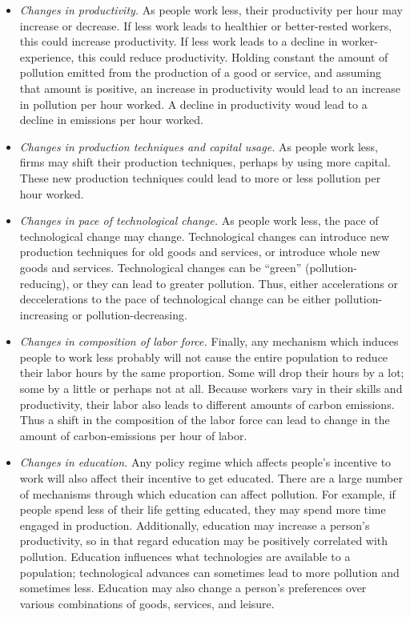 \documentclass[letter, 12pt, epsf,leqno]{article}
\begin{document}
\begin{itemize}
\item \textit{Changes in productivity.}  As people work less, their productivity per hour may increase or decrease.  If less work leads to healthier or better-rested workers, this could increase productivity.  If less work leads to a decline in worker-experience, this could reduce productivity.  Holding constant the amount of pollution emitted from the production of a good or service, and assuming that amount is positive, an increase in productivity would lead to an increase in pollution per hour worked.  A decline in productivity woud lead to a decline in emissions per hour worked.

\item \textit{Changes in production techniques and capital usage.} As people work less, firms may shift their production techniques, perhaps by using more capital.  These new production techniques could lead to more or less pollution per hour worked.

\item \textit{Changes in pace of technological change.} As people work less, the pace of technological change may change.  Technological changes can introduce new production techniques for old goods and services, or introduce whole new goods and services.  Technological changes can be ``green'' (pollution-reducing), or they can lead to greater pollution.  Thus, either accelerations or deccelerations to the pace of technological change can be either pollution-increasing or pollution-decreasing.

\item \textit{Changes in composition of labor force.} Finally, any mechanism which induces people to work less probably will not cause the entire population to reduce their labor hours by the same proportion.  Some will drop their hours by a lot; some by a little or perhaps not at all.  Because workers vary in their skills and productivity, their labor also leads to different amounts of carbon emissions.  Thus a shift in the composition of the labor force can lead to change in the amount of carbon-emissions per hour of labor.

\item \textit{Changes in education.}  Any policy regime which affects people's incentive to work will also affect their incentive to get educated.  There are a large number of mechanisms through which education can affect pollution.  For example, if people spend less of their life getting educated, they may spend more time engaged in production.  Additionally, education may increase a person's productivity, so in that regard education may be positively correlated with pollution.  Education influences what technologies are available to a population; technological advances can sometimes lead to more pollution and sometimes less.  Education may also change a person's preferences over various combinations of goods, services, and leisure.

\end{itemize}
\end{document}
